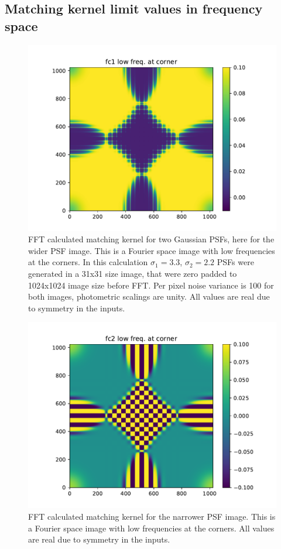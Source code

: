 \subsection{Matching kernel limit values in frequency space\label{sec:FFTlimits}}
\begin{figure}
\begin{center}
\includegraphics[width=5.5in]{fig/fft_steps_fc1.pdf}
\end{center}
\caption{\label{fig:fft_steps_fc1}FFT calculated matching kernel for two
  Gaussian PSFs, here for the wider PSF image. This is a Fourier space image
  with low frequencies at the corners. In this calculation \(\sigma_1=3.3\),
  \(\sigma_2=2.2\) PSFs were generated in a 31x31 size image, that were zero
  padded to 1024x1024 image size before FFT. Per pixel noise variance is 100
  for both images, photometric scalings are unity. All values are real due
  to symmetry in the inputs.}
\end{figure}
%
\begin{figure}
\begin{center}
\includegraphics[width=5.5in]{fig/fft_steps_fc2.pdf}
\end{center}
\caption{\label{fig:fft_steps_fc2}FFT calculated matching kernel for the
  narrower PSF image. This is a Fourier space image with low frequencies at
  the corners. All values are real due to symmetry in the inputs.}
\end{figure}
